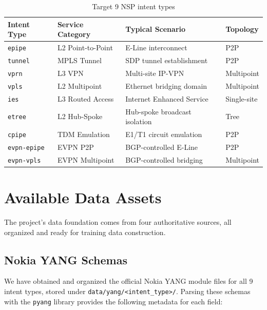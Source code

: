 \documentclass[12pt, a4paper]{article}
\newcommand{\intenttype}[1]{\texttt{#1}}
\newcommand{\filepath}[1]{\texttt{#1}}
\newcommand{\yang}{\textsc{YANG}}
\begin{document}
\begin{table}[H]
\centering
\caption{Target 9 NSP intent types}
\label{tab:intent-types}
\small
\begin{tabular}{llll}
\toprule
\textbf{Intent Type} & \textbf{Service Category} & \textbf{Typical Scenario} & \textbf{Topology} \\
\midrule
\intenttype{epipe}       & L2 Point-to-Point & E-Line interconnect         & P2P \\
\intenttype{tunnel}      & MPLS Tunnel        & SDP tunnel establishment    & P2P \\
\intenttype{vprn}        & L3 VPN             & Multi-site IP-VPN           & Multipoint \\
\intenttype{vpls}        & L2 Multipoint      & Ethernet bridging domain    & Multipoint \\
\intenttype{ies}         & L3 Routed Access   & Internet Enhanced Service   & Single-site \\
\intenttype{etree}       & L2 Hub-Spoke       & Hub-spoke broadcast isolation & Tree \\
\intenttype{cpipe}       & TDM Emulation      & E1/T1 circuit emulation     & P2P \\
\intenttype{evpn-epipe}  & EVPN P2P           & BGP-controlled E-Line       & P2P \\
\intenttype{evpn-vpls}   & EVPN Multipoint    & BGP-controlled bridging     & Multipoint \\
\bottomrule
\end{tabular}
\end{table}

\section{Available Data Assets}
\label{sec:data-assets}

The project's data foundation comes from four authoritative sources, all organized and ready for training data construction.

\subsection{Nokia YANG Schemas}

We have obtained and organized the official Nokia \yang{} module files for all 9 intent types, stored under \filepath{data/yang/<intent\_type>/}. Parsing these schemas with the \texttt{pyang} library provides the following metadata for each field:
\end{document}
